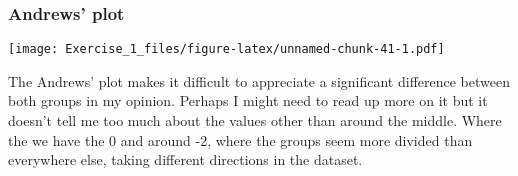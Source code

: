 \documentclass[]{article}
\newenvironment{Shaded}{\begin{snugshade}}{\end{snugshade}}
\newcommand{\DataTypeTok}[1]{\textcolor[rgb]{0.13,0.29,0.53}{#1}}
\newcommand{\DecValTok}[1]{\textcolor[rgb]{0.00,0.00,0.81}{#1}}
\newcommand{\KeywordTok}[1]{\textcolor[rgb]{0.13,0.29,0.53}{\textbf{#1}}}
\newcommand{\NormalTok}[1]{#1}
\newcommand{\OperatorTok}[1]{\textcolor[rgb]{0.81,0.36,0.00}{\textbf{#1}}}
\begin{document}
\hypertarget{andrews-plot}{%
\subsubsection{Andrews' plot}\label{andrews-plot}}

\begin{Shaded}
\end{Shaded}

\texttt{[image: Exercise\_1\_files/figure-latex/unnamed-chunk-41-1.pdf]}

The Andrews' plot makes it difficult to appreciate a significant
difference between both groups in my opinion. Perhaps I might need to
read up more on it but it doesn't tell me too much about the values
other than around the middle. Where the we have the 0 and around -2,
where the groups seem more divided than everywhere else, taking
different directions in the dataset.
\end{document}
